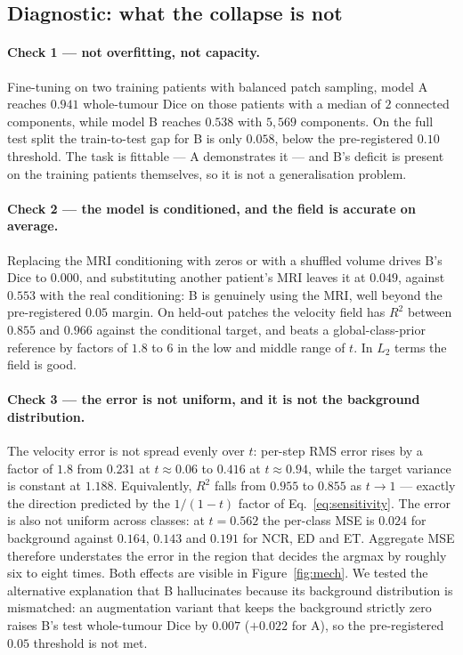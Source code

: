 \documentclass[conference]{IEEEtran}
\begin{document}
\subsection{Diagnostic: what the collapse is not}
\label{sec:diag}

\paragraph{Check 1 --- not overfitting, not capacity.}
Fine-tuning on two training patients with balanced patch sampling, model A
reaches $0.941$ whole-tumour Dice on those patients with a median of $2$
connected components, while model B reaches $0.538$ with $5{,}569$ components.
On the full test split the train-to-test gap for B is only $0.058$, below the
pre-registered $0.10$ threshold. The task is fittable --- A demonstrates it ---
and B's deficit is present on the training patients themselves, so it is not a
generalisation problem.

\paragraph{Check 2 --- the model is conditioned, and the field is accurate on
average.}
Replacing the MRI conditioning with zeros or with a shuffled volume drives B's
Dice to $0.000$, and substituting another patient's MRI leaves it at $0.049$,
against $0.553$ with the real conditioning: B is genuinely using the MRI, well
beyond the pre-registered $0.05$ margin. On held-out patches the velocity field
has $R^2$ between $0.855$ and $0.966$ against the conditional target, and beats
a global-class-prior reference by factors of $1.8$ to $6$ in the low and middle
range of $t$. In $L_2$ terms the field is good.

\paragraph{Check 3 --- the error is not uniform, and it is not the background
distribution.}
The velocity error is not spread evenly over $t$: per-step RMS error rises by a
factor of $1.8$ from $0.231$ at $t \approx 0.06$ to $0.416$ at $t \approx 0.94$,
while the target variance is constant at $1.188$. Equivalently, $R^2$ falls from
$0.955$ to $0.855$ as $t \to 1$ --- exactly the direction predicted by the
$1/(1-t)$ factor of Eq.~\eqref{eq:sensitivity}. The error is also not uniform across classes: at
$t = 0.562$ the per-class MSE is $0.024$ for background against $0.164$,
$0.143$ and $0.191$ for NCR, ED and ET. Aggregate MSE therefore understates the
error in the region that decides the argmax by roughly six to eight times. Both
effects are visible in Figure~\ref{fig:mech}. We
tested the alternative explanation that B hallucinates because its background
distribution is mismatched: an augmentation variant that keeps the background
strictly zero raises B's test whole-tumour Dice by $0.007$ ($+0.022$ for A), so
the pre-registered $0.05$ threshold is not met.
\end{document}
